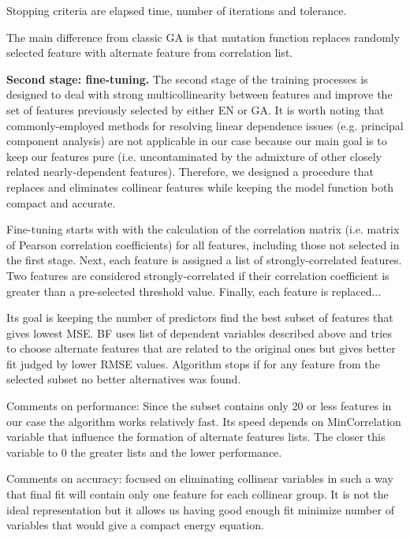 \documentclass[aps,prl,reprint,amsmath,amssymb,nature]{revtex4-1}
\begin{document}
Stopping criteria are elapsed time, number of iterations and tolerance. 

The main difference from classic GA is that mutation function replaces randomly selected feature with alternate feature from correlation list. 

\textbf{Second stage: fine-tuning.} The second stage of the training processes is designed to deal with strong multicollinearity between features and improve the set of features previously selected by either EN or GA. 
It is worth noting that commonly-employed methods for resolving linear dependence issues (e.g. principal component analysis) are not applicable in our case because our main goal is to keep our features pure (i.e. uncontaminated by the admixture of other closely related nearly-dependent features). 
Therefore, we designed a procedure that replaces and eliminates collinear features while keeping the model function both compact and accurate. 

Fine-tuning starts with with the calculation of the correlation matrix (i.e. matrix of Pearson correlation coefficients) for all features, including those not selected in the first stage. 
Next, each feature is assigned a list of strongly-correlated features. Two features are considered strongly-correlated if their correlation coefficient is greater than a pre-selected threshold value.
Finally, each feature is replaced...

\red

Its goal is keeping the number of predictors find the best subset of features that gives lowest MSE. 
BF uses list of dependent variables described above and tries to choose alternate features that are related to the original ones but gives better fit judged by lower RMSE values. 
Algorithm stops if for any feature from the selected subset no better alternatives was found. 

Comments on performance: Since the subset contains only 20 or less features in our case the algorithm works relatively fast. Its speed depends on MinCorrelation variable that influence the formation of alternate features lists. The closer this variable to 0 the greater lists and the lower performance. 

Comments on accuracy: focused on eliminating collinear variables in such a way that final fit will contain only one feature for each collinear group. It is not the ideal representation but it allows us having good enough fit minimize number of variables that would give a compact energy equation. 
\end{document}
